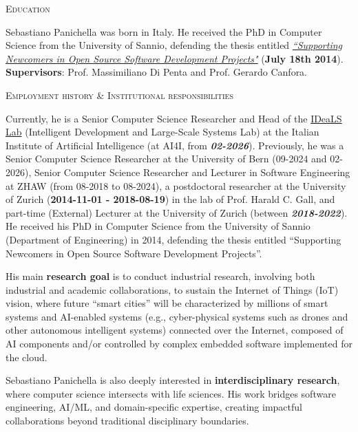 \documentclass[11pt]{article}
\begin{document}
\vspace{2.5mm}
\textsc{Education}
\vspace{1.5mm}

Sebastiano Panichella was born in Italy.
He received the PhD in Computer Science from the University of Sannio, defending the thesis entitled  \href{http://dx.doi.org/10.1109/ICSM.2015.7332519}{\textit{``Supporting Newcomers in Open Source Software Development Projects"}} (\textbf{July 18th 2014}). \textbf{Supervisors}: Prof. Massimiliano  Di Penta and Prof. Gerardo Canfora.

\vspace{2.5mm}
\textsc{Employment history \& Institutional responsibilities}
\vspace{1.5mm}


Currently, he is a Senior Computer Science Researcher and Head of the \href{https://ideals.rd-labs.ai4i.it/}{IDeaLS Lab} (Intelligent Development and Large-Scale Systems Lab) at the Italian Institute of Artificial Intelligence (at AI4I, from \textit{\textbf{02-2026}}). 
Previously, he was a Senior Computer Science Researcher at the University of Bern (09-2024 and 02-2026), Senior Computer Science Researcher and Lecturer in Software Engineering at ZHAW (from 08-2018 to 08-2024), a postdoctoral researcher at the University of Zurich (\textbf{2014-11-01 - 2018-08-19}) in the lab of Prof. Harald C. Gall, and part-time (External) Lecturer at the University of Zurich (between \textit{\textbf{2018-2022}}). He received his PhD in Computer Science from the University of Sannio (Department of Engineering) in 2014, defending the thesis entitled ``Supporting Newcomers in Open Source Software Development Projects''.

His main \textbf{research goal} is to conduct industrial research, involving both industrial and academic collaborations, to sustain the Internet of Things (IoT) vision, where future ``smart cities'' will be characterized by millions of smart systems and AI-enabled systems (e.g., cyber-physical systems such as drones and other autonomous intelligent systems) connected over the Internet, composed of AI components and/or controlled by complex embedded software implemented for the cloud.

Sebastiano Panichella is also deeply interested in \textbf{interdisciplinary research}, where computer science intersects with life sciences. His work bridges software engineering, AI/ML, and domain-specific expertise, creating impactful collaborations beyond traditional disciplinary boundaries.
\end{document}
